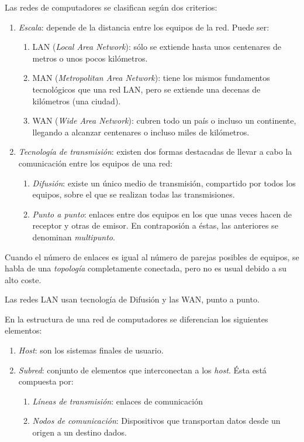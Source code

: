 \documentclass[10pt,a4paper,spanish]{report}
\begin{document}
Las redes de computadores se clasifican según dos criterios:
\begin{enumerate}[\color{tema1}{$\spadesuit$}]
  \item \textit{\textcolor{tema1}{Escala}}: depende de la distancia entre los equipos de la red. Puede ser:
  \begin{enumerate}[---]
    \item \textcolor{tema1}{LAN (\textit{Local Area Network})}: sólo se extiende hasta unos centenares de metros o unos pocos kilómetros.
    \item \textcolor{tema1}{MAN (\textit{Metropolitan Area Network})}: tiene los mismos fundamentos tecnológicos que una red LAN, pero se extiende una decenas de kilómetros (una ciudad). 
    \item \textcolor{tema1}{WAN (\textit{Wide Area Network})}: cubren todo un país o incluso un continente, llegando a alcanzar centenares o incluso miles de kilómetros.
  \end{enumerate}
  \item \textit{\textcolor{tema1}{Tecnología de transmisión}}: existen dos formas destacadas de llevar a cabo la comunicación entre los equipos de una red:
  \begin{enumerate}[---]
    \item \textcolor{tema1}{\textit{Difusión}}: existe un único medio de transmisión, compartido por todos los equipos, sobre el que se realizan todas las transmisiones.
    \item \textcolor{tema1}{\textit{Punto a punto}}: enlaces entre dos equipos en los que unas veces hacen de receptor y otras de emisor. En contraposión a éstas, las anteriores se denominan \textit{\textcolor{tema1}{multipunto}}.
  \end{enumerate}
\end{enumerate}

Cuando el número de enlaces es igual al número de parejas posibles de equipos, se habla de una \textit{\textcolor{tema1}{topología}} completamente conectada, pero no es usual debido a su alto coste.


\label{tectrans}


Las redes LAN usan tecnología de Difusión y las WAN, punto a punto.

En la estructura de una red de computadores se diferencian los siguientes elementos:
\begin{enumerate}[\color{tema1}{$\clubsuit$}]
  \item \textit{\textcolor{tema1}{Host}}: son los sistemas finales de usuario.
  \item \textit{\textcolor{tema1}{Subred}}: conjunto de elementos que interconectan a los \textit{\textcolor{tema1}{host}}. Ésta está compuesta por:
  \begin{enumerate}[---]
    \item \textit{\textcolor{tema1}{Líneas de transmisión}}: enlaces de comunicación
    \item \textit{\textcolor{tema1}{Nodos de comunicación}}: Dispositivos que transportan datos desde un origen a un destino dados.
  \end{enumerate}
\end{enumerate}
\end{document}
